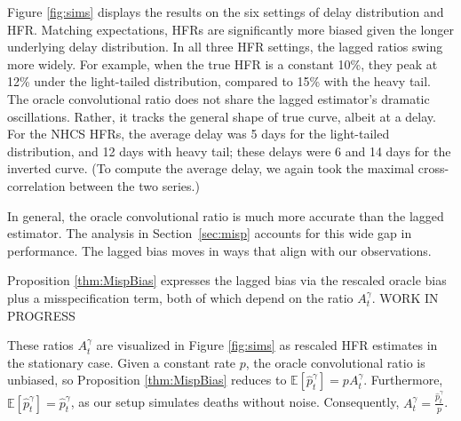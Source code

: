 \documentclass{article}
\renewcommand{\hat}{\widehat} %
\begin{document}
Figure \ref{fig:sims} displays the results on the six settings of delay distribution and HFR. 
Matching expectations, HFRs are significantly more biased given the longer underlying delay distribution. 
In all three HFR settings, the lagged ratios swing more widely. For example, when the true HFR is a constant 10\%, they peak at 12\% under the light-tailed distribution, compared to 15\% with the heavy tail. The oracle convolutional ratio does not share the lagged estimator's dramatic oscillations. Rather, it tracks the general shape of true curve, albeit at a delay. For the NHCS HFRs, the average delay was 5 days for the light-tailed distribution, and 12 days with heavy tail; these delays were 6 and 14 days for the inverted curve. (To compute the average delay, we again took the maximal cross-correlation between the two series.)

In general, the oracle convolutional ratio is much more accurate than the lagged estimator. The analysis in Section~\ref{sec:misp} accounts for this wide gap in performance. The lagged bias moves in ways that align with our observations.

Proposition \ref{thm:MispBias} expresses the lagged bias via the rescaled oracle bias plus a misspecification term, both of which depend on the ratio $A_t^\gamma$. WORK IN PROGRESS

These ratios $A_t^\gamma$ are visualized in Figure \ref{fig:sims} as rescaled HFR estimates in the stationary case.
Given a constant rate $p$, the oracle convolutional ratio is unbiased, so Proposition \ref{thm:MispBias} reduces to $\mathbb{E}[\hat{p}_t^\gamma] = p A_t^\gamma$. Furthermore, $\mathbb{E}[\hat{p}_t^\gamma] = \hat{p}_t^\gamma$, as our setup simulates deaths without noise. Consequently, $A_t^\gamma = \frac{\hat{p}_t^\gamma }{p}$. 
\end{document}
